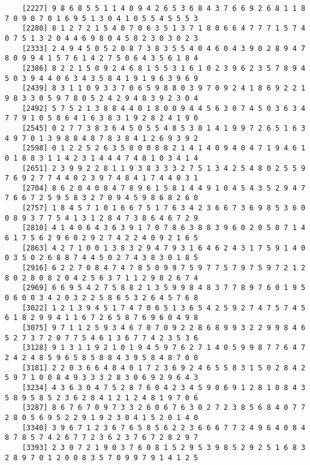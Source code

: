 \documentclass{article}
\begin{document}
\begin{itemize}
\begin{scriptsize}
\begin{verbatim}
	[2227] 9 8 6 8 5 5 1 1 4 0 9 4 2 6 5 3 6 8 4 3 7 6 6 9 2 6 8 1 1 8 7 0 9 0 7 0 1 6 9 5 1 3 0 4 1 0 5 5 4 5 5 5 3
	[2280] 8 1 2 7 2 1 5 4 0 7 0 6 3 5 1 3 7 1 8 0 6 6 4 7 7 7 1 5 7 4 0 7 5 1 3 2 0 4 4 6 9 8 0 4 5 8 2 3 0 3 0 2 3
	[2333] 2 4 9 4 5 0 5 2 0 8 7 3 8 3 5 5 4 0 4 6 0 4 3 9 0 2 8 9 4 7 8 0 9 9 4 1 5 7 6 1 4 2 7 5 0 6 4 3 5 6 1 8 4
	[2386] 8 2 2 1 5 0 9 2 4 6 8 1 5 5 3 1 6 1 0 2 3 9 6 2 3 5 7 8 9 4 5 0 3 9 4 4 0 6 3 4 3 5 8 4 1 9 1 9 6 3 9 6 9
	[2439] 8 3 1 1 0 9 3 3 7 0 6 5 9 8 8 0 3 9 7 0 9 2 4 1 8 6 9 2 2 1 9 8 3 3 0 5 9 7 8 0 5 2 4 2 9 4 8 3 9 2 3 0 4
	[2492] 5 7 5 2 1 3 8 8 4 4 0 1 8 0 0 9 4 4 5 6 3 0 7 4 5 0 3 6 3 4 7 7 9 1 0 5 8 6 4 1 6 3 8 3 1 9 2 8 2 4 1 9 0
	[2545] 0 2 7 7 3 8 3 6 4 5 0 5 5 4 8 5 3 8 1 4 1 9 9 7 2 6 5 1 6 3 4 9 7 0 1 3 9 8 8 4 8 7 8 3 8 4 1 2 6 9 3 9 2
	[2598] 0 1 2 2 5 2 6 3 5 8 0 0 8 8 2 1 4 1 4 0 9 4 0 4 7 1 9 4 6 1 0 1 8 8 3 1 1 4 2 3 1 4 4 4 7 4 8 1 0 3 4 1 4
	[2651] 2 3 9 9 2 2 8 1 1 9 3 8 3 3 3 2 7 5 1 3 4 2 5 4 8 0 2 5 5 9 7 6 9 2 7 7 4 4 0 2 3 9 7 4 8 4 1 7 4 4 0 3 1
	[2704] 8 6 2 0 4 0 8 4 7 8 9 6 1 5 8 1 4 4 9 1 0 4 5 4 3 5 2 9 4 7 7 6 6 7 2 5 9 5 8 3 2 7 0 9 4 5 9 8 6 8 2 6 0
	[2757] 1 8 4 5 7 1 0 1 6 6 7 5 1 7 6 3 4 2 3 6 6 7 3 6 9 8 5 3 6 0 0 8 9 3 7 7 5 4 1 3 1 2 8 4 7 3 8 6 4 6 7 2 9
	[2810] 4 1 4 0 6 4 3 6 3 9 1 7 0 7 8 6 3 8 8 3 9 6 0 2 0 5 0 7 1 4 6 1 7 5 6 2 9 6 0 2 9 2 7 4 2 2 4 0 9 2 1 6 5
	[2863] 4 2 7 1 0 0 1 3 8 3 2 9 4 7 9 3 1 6 4 6 2 4 3 1 7 5 9 1 4 0 0 3 5 0 2 6 8 8 7 4 4 5 0 2 7 4 3 8 3 0 1 8 5
	[2916] 6 2 2 7 0 8 4 7 4 7 8 5 0 9 9 7 5 9 7 7 5 7 9 7 5 9 7 2 1 2 8 0 2 8 0 8 2 0 4 2 5 6 3 7 1 1 2 9 8 2 6 7 4
	[2969] 6 6 9 5 4 2 7 5 8 8 2 1 3 5 9 9 8 4 8 3 7 7 8 9 7 6 0 1 9 5 0 6 0 0 3 4 2 0 3 2 2 5 8 6 5 3 2 6 4 5 7 6 8
	[3022] 1 2 1 3 9 4 5 1 7 4 7 0 6 5 1 3 6 5 4 2 5 9 2 7 4 7 5 7 4 5 6 1 8 2 9 9 4 1 1 6 7 2 6 5 8 7 6 9 6 0 4 9 8
	[3075] 9 7 1 1 2 5 9 3 4 6 7 0 7 0 9 2 2 8 6 8 9 9 3 2 2 9 9 8 4 6 5 2 7 3 7 2 0 7 7 5 4 6 1 3 6 7 7 4 2 3 5 3 6
	[3128] 9 1 3 1 1 9 2 1 0 1 9 4 5 9 7 6 2 7 1 4 0 5 9 9 8 7 7 6 4 7 2 4 2 4 8 5 9 6 5 8 5 8 8 4 3 9 5 8 4 8 7 0 0
	[3181] 2 2 0 3 6 6 4 8 4 0 1 7 2 3 6 9 2 4 6 5 5 8 3 1 5 0 2 8 4 2 5 9 7 1 0 0 8 4 9 3 3 3 2 8 3 0 6 9 2 9 6 4 3
	[3234] 4 3 6 3 0 4 7 5 2 8 7 6 0 4 2 3 4 5 9 0 6 9 1 2 8 1 0 8 4 3 5 8 9 5 8 5 2 3 6 2 8 4 1 2 1 2 4 8 1 9 7 0 6
	[3287] 8 6 7 6 7 0 9 7 3 3 2 6 0 6 7 6 3 0 2 7 2 3 8 5 6 8 4 0 7 7 2 8 0 5 6 9 5 2 2 9 1 9 2 3 0 4 1 5 2 0 1 4 0
	[3340] 3 9 6 7 1 2 3 6 7 6 5 8 5 6 2 2 3 6 6 6 7 7 2 4 9 6 4 0 8 4 8 7 8 5 7 4 2 6 7 7 2 3 6 2 3 7 6 7 2 8 2 9 7
	[3393] 2 3 0 7 2 1 9 0 3 7 6 0 8 1 5 2 9 5 3 9 8 5 2 9 2 5 1 6 8 3 2 8 9 7 0 1 2 0 0 8 3 5 7 0 9 9 7 9 1 4 1 2 5

\end{verbatim}
\end{scriptsize}
\end{itemize}
\end{document}
